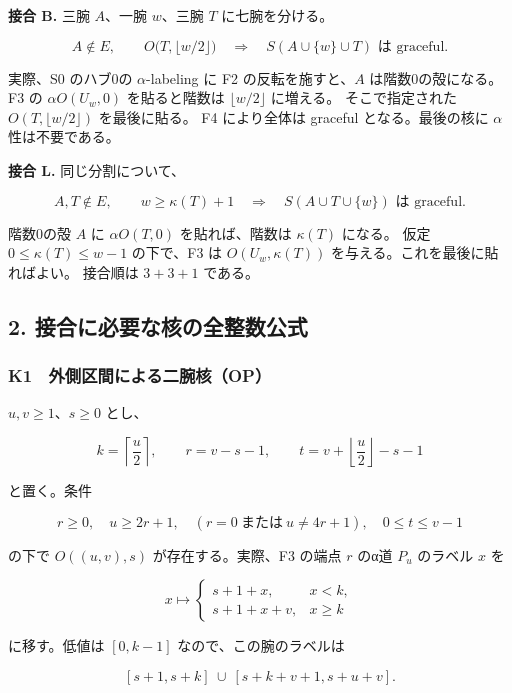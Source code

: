 \documentclass[
  10pt,
  a4paper,
]{article}
\begin{document}
\textbf{接合 B.} 三腕 \(A\)、一腕 \(w\)、三腕 \(T\) に七腕を分ける。

\[
A\notin E,\qquad O\bigl(T,\lfloor w/2\rfloor\bigr)
\quad\Longrightarrow\quad S(A\cup\{w\}\cup T)\text{ は graceful}.
\]

実際、S0 のハブ0の \(\alpha\)-labeling に F2 の反転を施すと、\(A\)
は階数0の殻になる。 F3 の \(\alpha O(U_w,0)\) を貼ると階数は
\(\lfloor w/2\rfloor\) に増える。 そこで指定された
\(O(T,\lfloor w/2\rfloor)\) を最後に貼る。 F4 により全体は graceful
となる。最後の核に \(\alpha\) 性は不要である。

\textbf{接合 L.} 同じ分割について、

\[
A,T\notin E,\qquad w\ge\kappa(T)+1
\quad\Longrightarrow\quad S(A\cup T\cup\{w\})\text{ は graceful}.
\]

階数0の殻 \(A\) に \(\alpha O(T,0)\) を貼れば、階数は \(\kappa(T)\)
になる。 仮定 \(0\le\kappa(T)\le w-1\) の下で、F3 は
\(O(U_w,\kappa(T))\) を与える。これを最後に貼ればよい。 接合順は
\(3+3+1\) である。

\subsection{2.
接合に必要な核の全整数公式}\label{ux63a5ux5408ux306bux5fc5ux8981ux306aux6838ux306eux5168ux6574ux6570ux516cux5f0f}

\subsubsection{K1　外側区間による二腕核（OP）}\label{k1-ux5916ux5074ux533aux9593ux306bux3088ux308bux4e8cux8155ux6838op}

\(u,v\ge1\)、\(s\ge0\) とし、

\[
k=\left\lceil\frac u2\right\rceil,\qquad
r=v-s-1,\qquad
t=v+\left\lfloor\frac u2\right\rfloor-s-1
\]

と置く。条件

\[
r\ge0,\quad u\ge2r+1,\quad
(r=0\ \text{または}\ u\ne4r+1),\quad 0\le t\le v-1
\]

の下で \(O((u,v),s)\) が存在する。実際、F3 の端点 \(r\) のα道 \(P_u\)
のラベル \(x\) を

\[
x\longmapsto\begin{cases}
s+1+x,&x<k,\\
s+1+x+v,&x\ge k
\end{cases}
\]

に移す。低値は \([0,k-1]\) なので、この腕のラベルは

\[
[s+1,s+k]\ \cup\ [s+k+v+1,s+u+v].
\]
\end{document}
